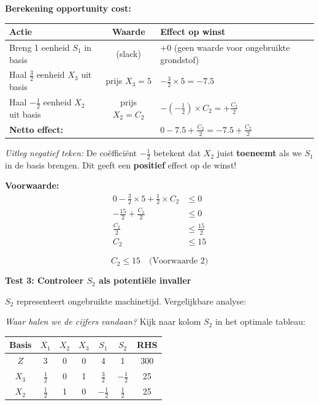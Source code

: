 \documentclass[a4paper,11pt]{article}
\begin{document}
\begin{oefenblok}[title=Productie Optimalisatie bij een Bedrijf]
\textbf{Berekening opportunity cost:}

\begin{center}
\begin{tabular}{l|c|l}
\hline
\textbf{Actie} & \textbf{Waarde} & \textbf{Effect op winst} \\
\hline
Breng 1 eenheid $S_1$ in basis & (slack) & $+0$ (geen waarde voor ongebruikte grondstof) \\
Haal $\frac{3}{2}$ eenheid $X_3$ uit basis & prijs $X_3 = 5$ & $-\frac{3}{2} \times 5 = -7.5$ \\
Haal $-\frac{1}{2}$ eenheid $X_2$ uit basis & prijs $X_2 = C_2$ & $-(-\frac{1}{2}) \times C_2 = +\frac{C_2}{2}$ \\
\hline
\multicolumn{2}{l|}{\textbf{Netto effect:}} & $0 - 7.5 + \frac{C_2}{2} = -7.5 + \frac{C_2}{2}$ \\
\hline
\end{tabular}
\end{center}

\textit{Uitleg negatief teken:} De coëfficiënt $-\frac{1}{2}$ betekent dat $X_2$ juist \textbf{toeneemt} als we $S_1$ in de basis brengen. Dit geeft een \textbf{positief} effect op de winst!

\textbf{Voorwaarde:}
\begin{align*}
0 - \frac{3}{2} \times 5 + \frac{1}{2} \times C_2 &\leq 0 \\
-\frac{15}{2} + \frac{C_2}{2} &\leq 0 \\
\frac{C_2}{2} &\leq \frac{15}{2} \\
C_2 &\leq 15
\end{align*}

$$\boxed{C_2 \leq 15} \quad \text{(Voorwaarde 2)}$$

\textbf{Test 3: Controleer $S_2$ als potentiële invaller}

$S_2$ representeert ongebruikte machinetijd. Vergelijkbare analyse:

\textit{Waar halen we de cijfers vandaan?} Kijk naar kolom $S_2$ in het optimale tableau:

\begin{center}
\begin{tabular}{c|ccccc|c}
\hline
Basis & $X_1$ & $X_2$ & $X_3$ & $S_1$ & $S_2$ & RHS \\
\hline
$Z$ & 3 & 0 & 0 & 4 & \cellcolor{yellow!30}1 & 300 \\
$X_3$ & $\frac{1}{2}$ & 0 & 1 & $\frac{3}{2}$ & \cellcolor{yellow!30}$-\frac{1}{2}$ & 25 \\
$X_2$ & $\frac{1}{2}$ & 1 & 0 & $-\frac{1}{2}$ & \cellcolor{yellow!30}$\frac{1}{2}$ & 25 \\
\hline
\end{tabular}
\end{center}


\end{oefenblok}
\end{document}
